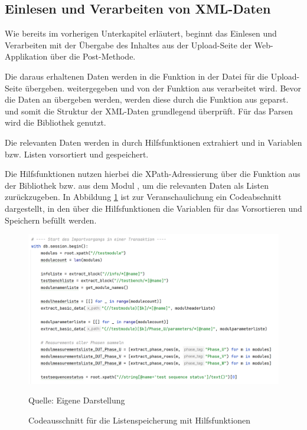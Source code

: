 \subsection{Einlesen und Verarbeiten von XML-Daten}
\label{subsec:einlesen-und-verarbeiten-von-xml-daten}

Wie bereits im vorherigen Unterkapitel erläutert, beginnt das Einlesen und Verarbeiten mit der Übergabe des Inhaltes aus der
Upload-Seite der Web-Applikation über die Post-Methode.

Die daraus erhaltenen Daten werden in die Funktion  in der Datei  für die Upload-Seite übergeben.
weitergegeben und von der Funktion  aus  verarbeitet wird.
Bevor die Daten an  übergeben werden, werden diese durch die Funktion  aus
 geparst.
und somit die Struktur der XML-Daten grundlegend überprüft.
Für das Parsen wird die Bibliothek  genutzt.

Die relevanten Daten werden in  durch Hilfsfunktionen extrahiert und in Variablen bzw. Listen
vorsortiert und gespeichert.

Die Hilfsfunktionen nutzen hierbei die XPath-Adressierung über die Funktion  aus der Bibliothek 
bzw. aus dem Modul , um die relevanten Daten als Listen zurückzugeben.
In Abbildung \ref{fig: Codeausschnitt für die Listenspeicherung mit Hilfsfunktionen} ist zur Veranschaulichung ein Codeabschnitt dargestellt, in den über die Hilfsfunktionen die Variablen
für das Vorsortieren und Speichern befüllt werden.

\begin{figure}[H]
    \centering
    \includegraphics[width=1\textwidth]{Grafiken/5.3 Listen}
    \caption{Codeausschnitt für die Listenspeicherung mit Hilfsfunktionen}
    \label{fig: Codeausschnitt für die Listenspeicherung mit Hilfsfunktionen}
    {Quelle: Eigene Darstellung}
\end{figure}

